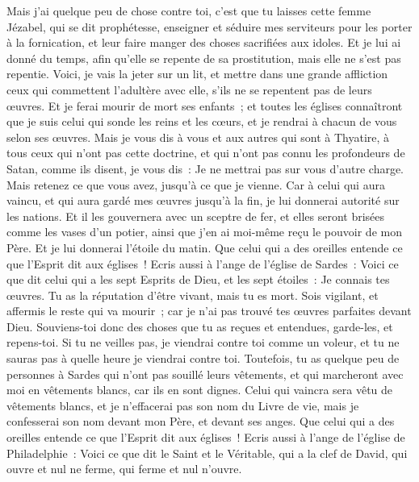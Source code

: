 \begin{multicols}{2}
Mais j'ai quelque peu de chose contre toi, c'est que tu laisses cette femme Jézabel, qui se dit prophétesse, enseigner et séduire mes serviteurs pour les porter à la fornication, et leur faire manger des choses sacrifiées aux idoles.
Et je lui ai donné du temps, afin qu'elle se repente de sa prostitution, mais elle ne s'est pas repentie.
Voici, je vais la jeter sur un lit, et mettre dans une grande affliction ceux qui commettent l'adultère avec elle, s'ils ne se repentent pas de leurs œuvres.
Et je ferai mourir de mort ses enfants~; et toutes les églises connaîtront que je suis celui qui sonde les reins et les cœurs, et je rendrai à chacun de vous selon ses œuvres.
Mais je vous dis à vous et aux autres qui sont à Thyatire, à tous ceux qui n'ont pas cette doctrine, et qui n'ont pas connu les profondeurs de Satan, comme ils disent, je vous dis~: Je ne mettrai pas sur vous d'autre charge.
Mais retenez ce que vous avez, jusqu'à ce que je vienne.
Car à celui qui aura vaincu, et qui aura gardé mes œuvres jusqu'à la fin, je lui donnerai autorité sur les nations.
Et il les gouvernera avec un sceptre de fer, et elles seront brisées comme les vases d'un potier, ainsi que j'en ai moi-même reçu le pouvoir de mon Père.
Et je lui donnerai l'étoile du matin.
Que celui qui a des oreilles entende ce que l'Esprit dit aux églises~!
\VerseOne{}Ecris aussi à l'ange de l'église de Sardes~: Voici ce que dit celui qui a les sept Esprits de Dieu, et les sept étoiles~: Je connais tes œuvres. Tu as la réputation d'être vivant, mais tu es mort.
Sois vigilant, et affermis le reste qui va mourir~; car je n'ai pas trouvé tes œuvres parfaites devant Dieu.
Souviens-toi donc des choses que tu as reçues et entendues, garde-les, et repens-toi. Si tu ne veilles pas, je viendrai contre toi comme un voleur, et tu ne sauras pas à quelle heure je viendrai contre toi.
Toutefois, tu as quelque peu de personnes à Sardes qui n'ont pas souillé leurs vêtements, et qui marcheront avec moi en vêtements blancs, car ils en sont dignes.
Celui qui vaincra sera vêtu de vêtements blancs, et je n'effacerai pas son nom du Livre de vie, mais je confesserai son nom devant mon Père, et devant ses anges.
Que celui qui a des oreilles entende ce que l'Esprit dit aux églises~!
Ecris aussi à l'ange de l'église de Philadelphie~: Voici ce que dit le Saint et le Véritable, qui a la clef de David, qui ouvre et nul ne ferme, qui ferme et nul n'ouvre.

\end{multicols}
